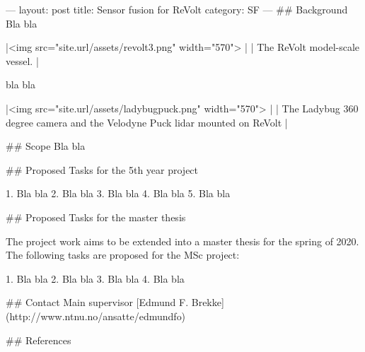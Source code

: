 ---
layout: post
title: Sensor fusion for ReVolt
category: SF
---
## Background
Bla bla

|<img src="{{site.url}}/assets/revolt3.png" width="570"> | 
| The ReVolt model-scale vessel. | 

bla bla 

|<img src="{{site.url}}/assets/ladybugpuck.png" width="570"> | 
| The Ladybug 360 degree camera and the Velodyne Puck lidar mounted on ReVolt  |

## Scope
Bla bla

## Proposed Tasks for the 5th year project

1. Bla bla
2. Bla bla
3. Bla bla
4. Bla bla 
5. Bla bla

## Proposed Tasks for the master thesis

The project work aims to be extended into a master thesis for the spring of 2020. The following tasks are proposed for the MSc project:

1. Bla bla
2. Bla bla
3. Bla bla
4. Bla bla

## Contact
Main supervisor [Edmund F. Brekke](http://www.ntnu.no/ansatte/edmundfo)

## References

